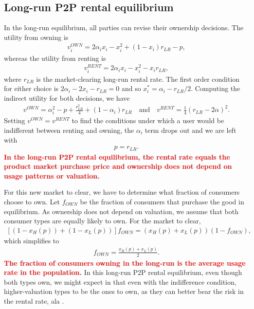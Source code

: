 \documentclass[11pt]{article}
\newcommand{\important}[1]{\textcolor{red}{\textbf{#1}}}
\newcommand{\important}[1]{#1}
\begin{document}
\subsection{Long-run P2P rental equilibrium} 
In the long-run equilibrium, all parties can revise their ownership decisions. 
The utility from owning is 
\begin{align}
v^{OWN}_i = 2\alpha_i x_i - x_i^2 + (1-x_i)r_{LR} - p,   
\end{align} 
whereas the utility from renting is 
\begin{align}
v^{RENT}_{i} = 2\alpha_i x_i - x_i^2 - x_i r_{LR}, 
\end{align} 
where $r_{LR}$ is the market-clearing long-run rental rate. 
The first order condition for either choice is $2 \alpha_i - 2 x_i - r_{LR} = 0$ and so $x^*_i = \alpha_i - r_{LR}/2$. 
Computing the indirect utility for both decisions, we have
\begin{align} 
v^{OWN} = \alpha_i^2 - p + \frac{r_{LR}^2}{4} + (1 - \alpha_i) r_{LR} \quad  \mbox{and} \quad v^{RENT} = \frac{1}{4} (r_{LR}- 2\alpha )^2. 
\end{align} 
Setting $v^{OWN} = v^{RENT}$ to find the conditions under which a user would be indifferent between renting and owning, the $\alpha_i$ term drops out and we are left with 
\begin{align}
p = r_{LR}. 
\end{align}
 \important{In the long-run P2P rental equilibrium, the rental rate equals the product market purchase price and ownership does not depend on usage patterns or valuation.}  

For this new market to clear, we have to determine what fraction of consumers choose to own. 
Let $f_{OWN}$ be the fraction of consumers that purchase the good in equilibrium. 
As ownership does not depend on valuation, we assume that both consumer types are equally likely to own. 
For the market to clear, 
\begin{align}
\left[ (1-x_H(p)) + (1-x_L(p))\right]f_{OWN} = \left(x_H(p) + x_L(p) \right)(1- f_{OWN}), 
\end{align} 
which simplifies to 
\begin{align}
f_{OWN} = \frac{x_H(p) + x_L(p)}{2}.  
\end{align} 
\important{The fraction of consumers owning in the long-run is the average usage rate in the population.}  
In this long-run P2P rental equilibrium, even though both types own, we might expect in that even with the indifference condition,  higher-valuation types to be the ones to own, as they can better bear the risk in the rental rate, ala \cite{sinai2005}.
\end{document}
